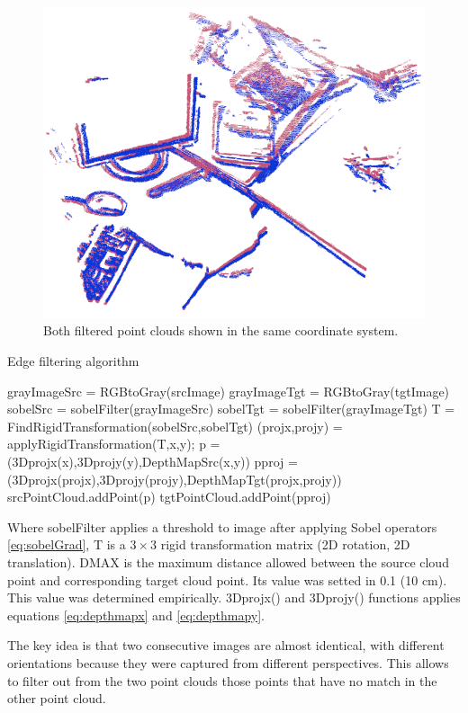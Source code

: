 \begin{figure}[H]
\begin{center}
\includegraphics[scale=0.3]{images/borders_both.png}
\caption{Both filtered point clouds shown in the same coordinate system.}
\end{center}
\end{figure}


\begin{algorithm}[H]
\caption{Edge filtering algorithm}
\label{alg:edges}
\begin{algorithmic}[1]
\State grayImageSrc = RGBtoGray(srcImage)
\State grayImageTgt = RGBtoGray(tgtImage)
\State sobelSrc = sobelFilter(grayImageSrc)
\State sobelTgt = sobelFilter(grayImageTgt)
\State T = FindRigidTransformation(sobelSrc,sobelTgt)
\State (projx,projy) = applyRigidTransformation(T,x,y);
\State p = (3Dprojx(x),3Dprojy(y),DepthMapSrc(x,y))
\State pproj = (3Dprojx(projx),3Dprojy(projy),DepthMapTgt(projx,projy))
\State srcPointCloud.addPoint(p)
\State tgtPointCloud.addPoint(pproj)
\EndIf
\EndIf
\EndIf
\EndFor
\end{algorithmic}
\end{algorithm}

Where sobelFilter applies a threshold to image after applying Sobel operators \ref{eq:sobelGrad}, T is a $3\times3$ rigid transformation matrix (2D rotation, 2D translation). DMAX is the maximum distance allowed between the source cloud point and corresponding target cloud point. 
Its value was setted in 0.1 (10 cm).  This value was determined empirically. 3Dprojx() and 3Dprojy() functions applies equations \ref{eq:depthmapx} and \ref{eq:depthmapy}.

The key idea is that two consecutive images are almost identical, 
with different orientations because they were captured from different perspectives. This allows 
to filter out from the two point clouds those points that have no match in the other point cloud.

